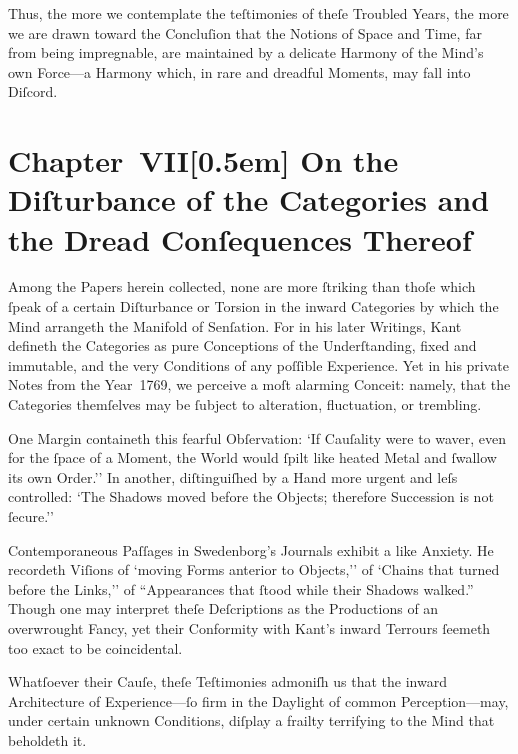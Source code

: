 \documentclass[12pt]{book}
\begin{document}
Thus, the more we contemplate the teſtimonies of theſe Troubled Years, the more we are drawn toward the Concluſion that the Notions of Space and Time, far from being impregnable, are maintained by a delicate Harmony of the Mind’s own Force—a Harmony which, in rare and dreadful Moments, may fall into Diſcord.


\chapter*{Chapter~VII[0.5em]
On the Diſturbance of the Categories and the Dread Conſequences Thereof}


Among the Papers herein collected, none are more ſtriking than thoſe which ſpeak of a certain Diſturbance or Torsion in the inward Categories by which the Mind arrangeth the Manifold of Senſation. For in his later Writings, Kant defineth the Categories as pure Conceptions of the Underſtanding, fixed and immutable, and the very Conditions of any poſſible Experience. Yet in his private Notes from the Year~1769, we perceive a moſt alarming Conceit: namely, that the Categories themſelves may be ſubject to alteration, fluctuation, or trembling.

One Margin containeth this fearful Obſervation: `If Cauſality were to waver, even for the ſpace of a Moment, the World would ſpilt like heated Metal and ſwallow its own Order.'' In another, diſtinguiſhed by a Hand more urgent and leſs controlled: `The Shadows moved before the Objects; therefore Succession is not ſecure.''

Contemporaneous Paſſages in Swedenborg’s Journals exhibit a like Anxiety. He recordeth Viſions of `moving Forms anterior to Objects,'' of `Chains that turned before the Links,'' of ``Appearances that ſtood while their Shadows walked.'' Though one may interpret theſe Deſcriptions as the Productions of an overwrought Fancy, yet their Conformity with Kant’s inward Terrours ſeemeth too exact to be coincidental.

Whatſoever their Cauſe, theſe Teſtimonies admoniſh us that the inward Architecture of Experience—ſo firm in the Daylight of common Perception—may, under certain unknown Conditions, diſplay a frailty terrifying to the Mind that beholdeth it.
\end{document}
